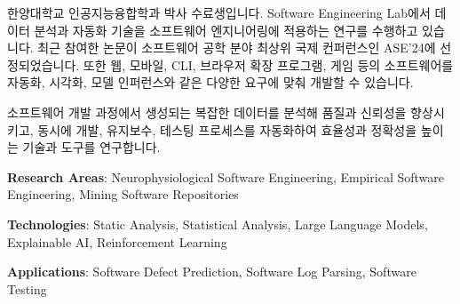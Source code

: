 \begin{cvletter}
    
    한양대학교 인공지능융합학과 박사 수료생입니다. Software Engineering Lab에서 데이터 분석과 자동화 기술을 소프트웨어 엔지니어링에 적용하는 연구를 수행하고 있습니다. 최근 참여한 논문이 소프트웨어 공학 분야 최상위 국제 컨퍼런스인 ASE’24에 선정되었습니다. 또한 웹, 모바일, CLI, 브라우저 확장 프로그램, 게임 등의 소프트웨어를 자동화, 시각화, 모델 인퍼런스와 같은 다양한 요구에 맞춰 개발할 수 있습니다.

    

    소프트웨어 개발 과정에서 생성되는 복잡한 데이터를 분석해 품질과 신뢰성을 향상시키고, 동시에 개발, 유지보수, 테스팅 프로세스를 자동화하여 효율성과 정확성을 높이는 기술과 도구를 연구합니다.
    \vspace{2.0mm}
    \begin{cvitems}
        \item \textbf{Research Areas}: Neurophysiological Software Engineering, Empirical Software Engineering, Mining Software Repositories
        \item \textbf{Technologies}: Static Analysis, Statistical Analysis, Large Language Models, Explainable AI, Reinforcement Learning
        \item \textbf{Applications}: Software Defect Prediction, Software Log Parsing, Software Testing
    \end{cvitems}
    \vspace{2.0mm}
\end{cvletter}
